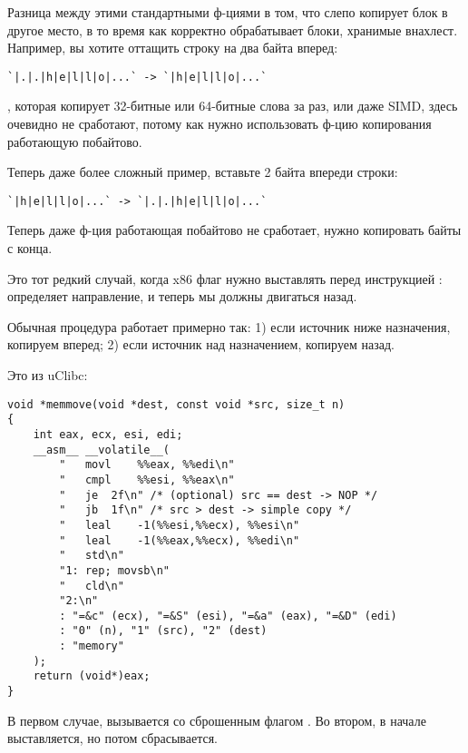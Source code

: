 \label{memmove_and_DF}

Разница между этими стандартными ф-циями в том, что 
 слепо копирует блок в другое место,
в то время как  корректно обрабатывает блоки, хранимые внахлест.
Например, вы хотите оттащить строку на два байта вперед:

\begin{lstlisting}
`|.|.|h|e|l|l|o|...` -> `|h|e|l|l|o|...`
\end{lstlisting}

, которая копирует 32-битные или 64-битные слова за раз, или даже \ac{SIMD},
здесь очевидно не сработают, потому как нужно использовать ф-цию копирования работающую побайтово.

Теперь даже более сложный пример, вставьте 2 байта впереди строки:

\begin{lstlisting}
`|h|e|l|l|o|...` -> `|.|.|h|e|l|l|o|...`
\end{lstlisting}

Теперь даже ф-ция работающая побайтово не сработает, нужно копировать байты с конца.

Это тот редкий случай, когда x86 флаг  нужно выставлять перед инструкцией :
 определяет направление, и теперь мы должны двигаться назад.

Обычная процедура  работает примерно так:
1) если источник ниже назначения, копируем вперед;
2) если источник над назначением, копируем назад.

Это  из uClibc:

\begin{lstlisting}[style=customc]
void *memmove(void *dest, const void *src, size_t n)
{
	int eax, ecx, esi, edi;
	__asm__ __volatile__(
		"	movl	%%eax, %%edi\n"
		"	cmpl	%%esi, %%eax\n"
		"	je	2f\n" /* (optional) src == dest -> NOP */
		"	jb	1f\n" /* src > dest -> simple copy */
		"	leal	-1(%%esi,%%ecx), %%esi\n"
		"	leal	-1(%%eax,%%ecx), %%edi\n"
		"	std\n"
		"1:	rep; movsb\n"
		"	cld\n"
		"2:\n"
		: "=&c" (ecx), "=&S" (esi), "=&a" (eax), "=&D" (edi)
		: "0" (n), "1" (src), "2" (dest)
		: "memory"
	);
	return (void*)eax;
}
\end{lstlisting}

В первом случае,  вызывается со сброшенным флагом .
Во втором,  в начале выставляется, но потом сбрасывается.

